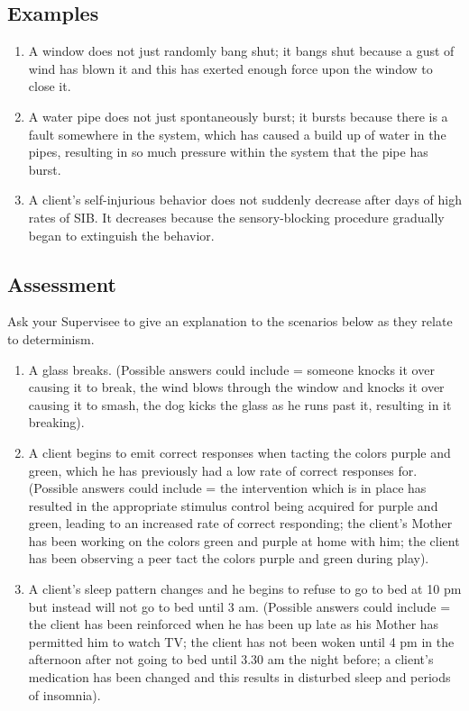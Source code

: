 \subsection{Examples}
\begin{enumerate}
\item A window does not just randomly bang shut; it bangs shut because a gust of wind has blown it and this has exerted enough force upon the window to close it. 
\item A water pipe does not just spontaneously burst; it bursts because there is a fault somewhere in the system, which has caused a build up of water in the pipes, resulting in so much pressure within the system that the pipe has burst.
\item A client's self-injurious behavior does not suddenly decrease after days of high rates of SIB. It decreases because the sensory-blocking procedure gradually began to extinguish the behavior.
%
\end{enumerate}
%
\subsection{Assessment}
Ask your Supervisee to give an explanation to the scenarios below as they relate to determinism.
\begin{enumerate}
\item A glass breaks. (Possible answers could include = someone knocks it over causing it to break, the wind blows through the window and knocks it over causing it to smash, the dog kicks the glass as he runs past it, resulting in it breaking).
\item A client begins to emit correct responses when tacting the colors purple and green, which he has previously had a low rate of correct responses for. (Possible answers could include = the intervention which is in place has resulted in the appropriate stimulus control being acquired for purple and green, leading to an increased rate of correct responding; the client's Mother has been working on the colors green and purple at home with him; the client has been observing a peer tact the colors purple and green during play).
\item A client's sleep pattern changes and he begins to refuse to go to bed at 10 pm but instead will not go to bed until 3 am. (Possible answers could include = the client has been reinforced when he has been up late as his Mother has permitted him to watch TV; the client has not been woken until 4 pm in the afternoon after not going to bed until 3.30 am the night before; a client's medication has been changed and this results in disturbed sleep and periods of insomnia). 
\end{enumerate}
%
